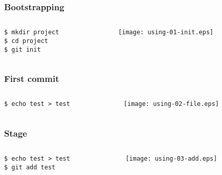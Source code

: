 \documentclass[english]{beamer}
\newcommand{\CMD}[1]{%
\texttt{\textcolor{code-green}{#1}}%
}
\newcommand{\cmd}[1]{%
\texttt{\textcolor{code-orange}{#1}}%
}
\begin{document}
\begin{frame}
\frametitle{Bootstrapping}

\begin{columns}[t]
        \begin{column}[T]{.5\textwidth}
                \cmd{\$ mkdir project} \\
                \cmd{\$ cd project} \\
                \CMD{\$ git init}
        \end{column}
        \begin{column}[T]{.5\textwidth}
                \texttt{[image: using-01-init.eps]}
        \end{column}
\end{columns}
\end{frame}

\begin{frame}
\frametitle{First commit}
\begin{columns}[t]
        \begin{column}[T]{.5\textwidth}
                \cmd{\$ echo test > test}
        \end{column}
        \begin{column}[T]{.5\textwidth}
                \texttt{[image: using-02-file.eps]}
        \end{column}
\end{columns}
\end{frame}

\begin{frame}
\frametitle{Stage}
\begin{columns}[t]
        \begin{column}[T]{.5\textwidth}
                \cmd{\$ echo test > test} \\
                \CMD{\$ git add test}
        \end{column}
        \begin{column}[T]{.5\textwidth}
                \texttt{[image: using-03-add.eps]}
        \end{column}
\end{columns}
\end{frame}
\end{document}
